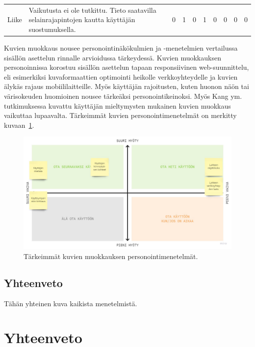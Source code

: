 \documentclass[finnish, 12pt, a4paper, elec, utf8, a-1b, online]{aaltothesis}
\begin{document}
{\begin{longtable}{p{2.5cm}|p{6cm}|p{0.5cm}p{0.5cm}p{0.5cm}|p{0.5cm}|p{0.5cm}p{0.5cm}p{0.5cm}|p{0.5cm}|}
        \midrule
        Liike                                  & Vaikutusta ei ole tutkittu. Tieto saatavilla selainrajapintojen kautta käyttäjän suostumuksella.                                                                                                                                                                                                                                                                          & 0                                          & 1                                   & 0                                      & 1                            & 0                                               & 0                                         & 0                                         & 0                            \\
    \end{longtable}
}

Kuvien muokkaus nousee personointinäkökulmien ja -menetelmien vertailussa
sisällön asettelun rinnalle arvioidussa tärkeydessä. Kuvien muokkauksen
personoinnissa korostuu sisällön asettelun tapaan responsiivinen
web-suunnittelu, eli esimerkiksi kuvaformaattien optimointi heikolle
verkkoyhteydelle ja kuvien älykäs rajaus mobiililaitteille. Myös käyttäjän
rajoitusten, kuten huonon näön tai värisokeuden huomioinen nousee tärkeäksi
personointikeinoksi. Myös Kang ym.~\cite{5539850} tutkimuksessa kuvattu
käyttäjän mieltymysten mukainen kuvien muokkaus vaikuttaa lupaavalta. Tärkeimmät
kuvien personointimenetelmät on merkitty kuvaan~\ref{fig:images-priorization}.

\begin{figure}[htb]
    \centering
    \includegraphics[width=\textwidth]{images/images-priorization.pdf}
    \caption{Tärkeimmät kuvien muokkauksen personointimenetelmät.~\label{fig:images-priorization}}
\end{figure}

\subsection{Yhteenveto}

Tähän yhteinen kuva kaikista menetelmistä.

\clearpage

\section{Yhteenveto}

\clearpage

\thesisbibliography{}
\printbibliography{}
\end{document}
